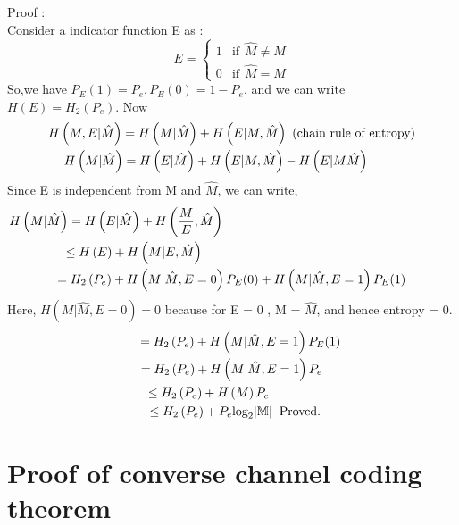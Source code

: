 \documentclass{article}
\begin{document}
 Proof : \\
 Consider a indicator function  E as :
 \begin{equation}
 	E = \left\{\begin{matrix}
 	1 	& \text{if}  \hspace{5pt}\hat{M} \neq  M \\ 
 	0	&  \text{if} \hspace{5pt} \hat{M} = M
 	\end{matrix}\right.
 \end{equation}
 So,we have $P_E(1)= P_e , P_E(0) = 1 -P_e$, and we can write $H(E) = H_{2}(P_e)$. Now
\begin{gather}
H \left (M,E|\hat{M} \right) = H \left (M|\hat{M} \right ) + H \left(E|M, \hat{M} \right) \text{ (chain rule of entropy)}\\
\hspace*{-9mm}H \left(M|\hat{M} \right)  = H \left( E|\hat{M}\right) +  H \left( E|M, \hat{M} \right) - H\left( E|M\hat{M} \right)
\end{gather} 
Since E is independent from M and $\hat{M}$, we can write, 
\begin{gather}
\hspace*{-6.5cm} H \left(M| \hat{M}\right)  = H \left( E|\hat{M} \right) +  H \left( \frac{M}{E}, \hat{M} \right)\\
\hspace*{-5.5cm} \leq  H\left( E\right) +   H \left( M|E, \hat{M} \right) \\
 = H_{2}\left( P_e\right) +   H \left( M| \hat{M}, E=0 \right) P_E(0) +  H \left( M| \hat{M}, E=1 \right) P_E(1)
\end{gather}
Here,  $ H \left( M| \hat{M}, E=0 \right) = 0$ because for E = 0 , M = $\hat{M}$, and hence entropy = 0.
 \begin{gather}
\hspace*{.5cm} = H_{2}\left( P_e\right) +  H \left( M| \hat{M}, E=1 \right) P_E(1)\\
 = H_{2}\left( P_e\right) +  H \left( M| \hat{M}, E=1 \right) P_e\\
\hspace*{-1.3cm} \leq  H_{2}\left( P_e\right) +  H \left(M\right) P_e\\
\hspace*{.2cm} \leq  H_{2}\left( P_e\right) +  P_e \text{log}_{2}|\mathbb{M}|\hspace*{2mm} \text{Proved.}
 \end{gather}
 \section{Proof of converse channel coding theorem}
\end{document}
